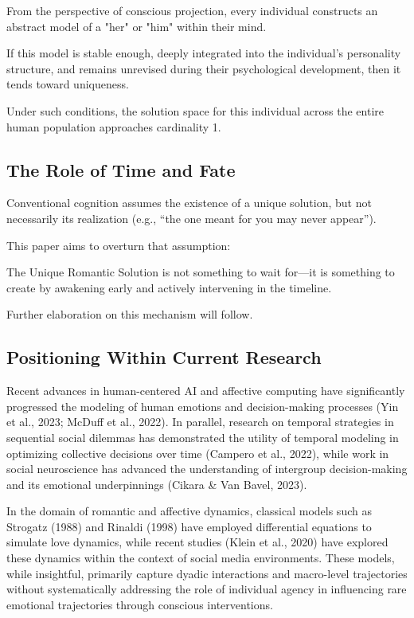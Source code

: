 \documentclass{article}
\begin{document}
From the perspective of conscious projection, every individual constructs an abstract model of a "her" or "him" within their mind.

If this model is stable enough, deeply integrated into the individual's personality structure, and remains unrevised during their psychological development, then it tends toward uniqueness.

Under such conditions, the solution space for this individual across the entire human population approaches cardinality 1.

\subsection{The Role of Time and Fate}

Conventional cognition assumes the existence of a unique solution, but not necessarily its realization (e.g., “the one meant for you may never appear”).

This paper aims to overturn that assumption:

The Unique Romantic Solution is not something to wait for—it is something to create by awakening early and actively intervening in the timeline.

Further elaboration on this mechanism will follow.

\subsection{Positioning Within Current Research}

Recent advances in human-centered AI and affective computing have significantly progressed the modeling of human emotions and decision-making processes (Yin et al., 2023; McDuff et al., 2022). In parallel, research on temporal strategies in sequential social dilemmas has demonstrated the utility of temporal modeling in optimizing collective decisions over time (Campero et al., 2022), while work in social neuroscience has advanced the understanding of intergroup decision-making and its emotional underpinnings (Cikara \& Van Bavel, 2023).

In the domain of romantic and affective dynamics, classical models such as Strogatz (1988) and Rinaldi (1998) have employed differential equations to simulate love dynamics, while recent studies (Klein et al., 2020) have explored these dynamics within the context of social media environments. These models, while insightful, primarily capture dyadic interactions and macro-level trajectories without systematically addressing the role of individual agency in influencing rare emotional trajectories through conscious interventions.
\end{document}

